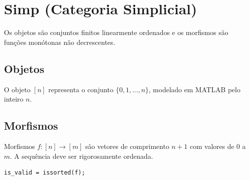 \section{Simp (Categoria Simplicial)}

Os objetos são conjuntos finitos linearmente ordenados e os morfismos são funções monótonas não decrescentes.

\subsection{Objetos}
O objeto $[n]$ representa o conjunto $\{0, 1, \dots, n\}$, modelado em MATLAB pelo inteiro $n$.

\subsection{Morfismos}
Morfismos $f: [n] \to [m]$ são vetores de comprimento $n + 1$ com valores de $0$ a $m$. A sequência deve ser rigorosamente ordenada.

\begin{lstlisting}[caption={Validação Simplicial}]
is_valid = issorted(f);
\end{lstlisting}